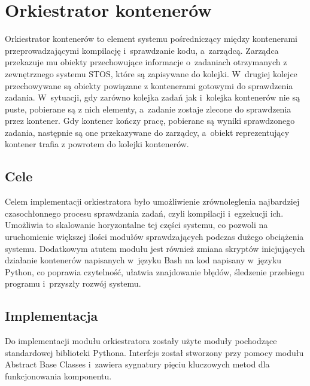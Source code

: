 \section{Orkiestrator kontenerów}
Orkiestrator kontenerów to element systemu pośredniczący między kontenerami przeprowadzającymi kompilację i~sprawdzanie kodu, a~zarządcą. Zarządca przekazuje mu obiekty przechowujące informacje o~zadaniach otrzymanych z zewnętrznego systemu STOS, które są zapisywane do kolejki. W~drugiej kolejce przechowywane są obiekty powiązane z kontenerami gotowymi do sprawdzenia zadania. W~sytuacji, gdy zarówno kolejka zadań jak i~kolejka kontenerów nie są puste, pobierane są z nich elementy, a~zadanie zostaje zlecone do sprawdzenia przez kontener. Gdy kontener kończy pracę, pobierane są wyniki sprawdzonego zadania, następnie są one przekazywane do zarządcy, a~obiekt reprezentujący kontener trafia z powrotem do kolejki kontenerów.

\subsection{Cele}
Celem implementacji orkiestratora było umożliwienie zrównoleglenia najbardziej czasochłonnego procesu sprawdzania zadań, czyli kompilacji i~egzekucji ich. Umożliwia to skalowanie horyzontalne tej części systemu, co pozwoli na uruchomienie większej ilości modułów sprawdzających podczas dużego obciążenia systemu. Dodatkowym atutem modułu jest również zmiana skryptów inicjujących działanie kontenerów napisanych w~języku Bash na kod napisany w~języku Python, co poprawia czytelność, ułatwia znajdowanie błędów, śledzenie przebiegu programu i~przyszły rozwój systemu.


\subsection{Implementacja}
Do implementacji modułu orkiestratora zostały użyte moduły pochodzące standardowej biblioteki Pythona. Interfejs został stworzony przy pomocy modułu Abstract Base Classes\cite{pythonAbc} i~zawiera sygnatury pięciu kluczowych metod dla funkcjonowania komponentu. 

